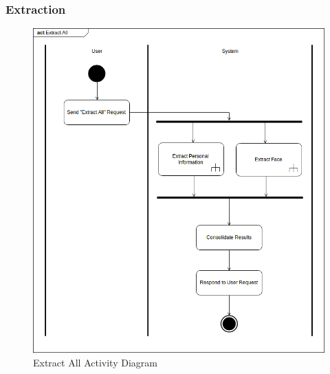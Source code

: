 \documentclass{article}
\begin{document}
\subsubsection{Extraction}
	\begin{figure}[!h]
		\centering
		\includegraphics[scale=0.65]{img/extract_all_activity.png}
		\caption{Extract All Activity Diagram}
	\end{figure}
\pagebreak
\end{document}
